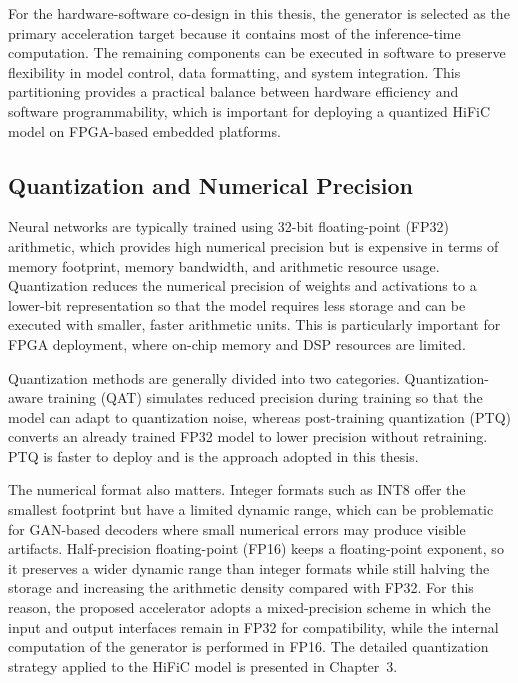 For the hardware-software co-design in this thesis, the generator is selected as the primary acceleration target because it contains most of the inference-time computation. The remaining components can be executed in software to preserve flexibility in model control, data formatting, and system integration. This partitioning provides a practical balance between hardware efficiency and software programmability, which is important for deploying a quantized HiFiC model on FPGA-based embedded platforms. \cite{mentzer2020high,sze2017efficient}

\subsection{Quantization and Numerical Precision}

Neural networks are typically trained using 32-bit floating-point (FP32) arithmetic, which provides high numerical precision but is expensive in terms of memory footprint, memory bandwidth, and arithmetic resource usage. Quantization reduces the numerical precision of weights and activations to a lower-bit representation so that the model requires less storage and can be executed with smaller, faster arithmetic units. This is particularly important for FPGA deployment, where on-chip memory and DSP resources are limited.

Quantization methods are generally divided into two categories. Quantization-aware training (QAT) simulates reduced precision during training so that the model can adapt to quantization noise, whereas post-training quantization (PTQ) converts an already trained FP32 model to lower precision without retraining. PTQ is faster to deploy and is the approach adopted in this thesis.

The numerical format also matters. Integer formats such as INT8 offer the smallest footprint but have a limited dynamic range, which can be problematic for GAN-based decoders where small numerical errors may produce visible artifacts. Half-precision floating-point (FP16) keeps a floating-point exponent, so it preserves a wider dynamic range than integer formats while still halving the storage and increasing the arithmetic density compared with FP32. For this reason, the proposed accelerator adopts a mixed-precision scheme in which the input and output interfaces remain in FP32 for compatibility, while the internal computation of the generator is performed in FP16. The detailed quantization strategy applied to the HiFiC model is presented in Chapter~3.



